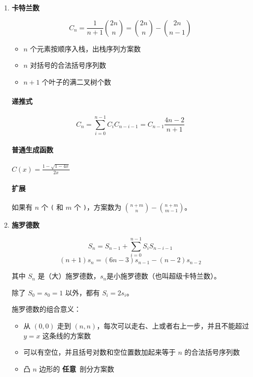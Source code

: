 \begin{enumerate}

\item \textbf{卡特兰数}

$$C_n = \frac 1 {n + 1}{2n\choose n} = {2n \choose n} - {2n \choose n - 1}$$

\begin{itemize}
	\item $n$ 个元素按顺序入栈，出栈序列方案数
	\item $n$ 对括号的合法括号序列数
	\item $n + 1$ 个叶子的满二叉树个数
\end{itemize}

\paragraph{递推式}
$$ C_n = \sum_{i = 0} ^ {n - 1} C_i C_{n - i - 1} = C_{n - 1} \frac {4n - 2} {n + 1} $$

\paragraph{普通生成函数} $C(x) = \frac {1 - \sqrt {1 - 4 x}} {2 x}$

\paragraph{扩展} 如果有 $n$ 个 \texttt{(} 和 $m$ 个 \texttt{)}，方案数为 ${n + m \choose n} - {n + m \choose m - 1}$。

\item \textbf{施罗德数}

$$ S_n = S_{n-1} + \sum_{i = 0} ^ {n - 1} S_i S_{n - i - 1} $$
$$ (n + 1)s_n = (6n - 3)s_{n - 1} - (n - 2) s_{n - 2} $$

其中 $S_n$ 是（大）施罗德数，$s_n$是小施罗德数（也叫超级卡特兰数）。

除了 $S_0 = s_0 = 1$ 以外，都有 $S_i = 2s_i$。

施罗德数的组合意义：

\begin{itemize}
	\item 从 $(0, 0)$ 走到 $(n, n)$，每次可以走右、上或者右上一步，并且不能超过 $y=x$ 这条线的方案数
	\item 可以有空位，并且括号对数和空位置数加起来等于 $n$ 的合法括号序列数
	\item 凸 $n$ 边形的 \textbf{任意}\ 剖分方案数
\end{itemize}


\end{enumerate}
